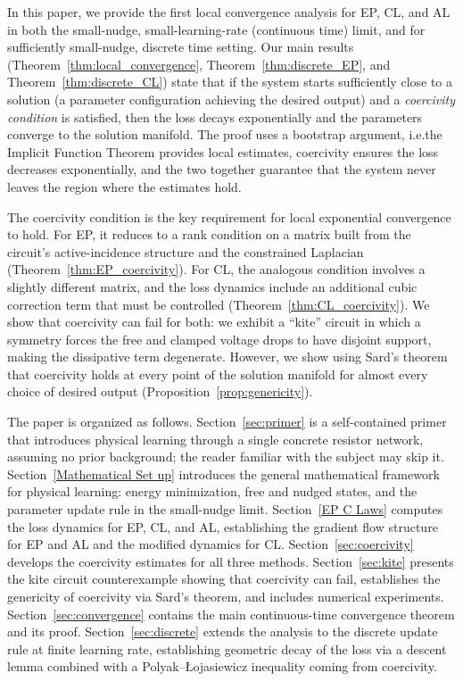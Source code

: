 \documentclass{siamart}
\begin{document}
In this paper, we provide the first local convergence analysis for EP, CL, and AL in both the small-nudge, small-learning-rate (continuous time) limit, and for sufficiently small-nudge, discrete time setting. Our main results (Theorem~\ref{thm:local_convergence}, Theorem~\ref{thm:discrete_EP}, and Theorem~\ref{thm:discrete_CL}) state that if the system starts sufficiently close to a solution (a parameter configuration achieving the desired output) and a \emph{coercivity condition} is satisfied, then the loss decays exponentially and the parameters converge to the solution manifold. The proof uses a bootstrap argument, i.e.\@ the Implicit Function Theorem provides local estimates, coercivity ensures the loss decreases exponentially, and the two together guarantee that the system never leaves the region where the estimates hold.

The coercivity condition is the key requirement for local exponential convergence to hold. For EP, it reduces to a rank condition on a matrix built from the circuit's active-incidence structure and the constrained Laplacian (Theorem~\ref{thm:EP_coercivity}). For CL, the analogous condition involves a slightly different matrix, and the loss dynamics include an additional cubic correction term that must be controlled (Theorem~\ref{thm:CL_coercivity}). We show that coercivity can fail for both: we exhibit a ``kite'' circuit in which a symmetry forces the free and clamped voltage drops to have disjoint support, making the dissipative term degenerate. However, we show using Sard's theorem that coercivity holds at every point of the solution manifold for almost every choice of desired output (Proposition~\ref{prop:genericity}).

The paper is organized as follows. Section~\ref{sec:primer} is a self-contained primer that introduces physical learning through a single concrete resistor network, assuming no prior background; the reader familiar with the subject may skip it. Section~\ref{Mathematical Set up} introduces the general mathematical framework for physical learning: energy minimization, free and nudged states, and the parameter update rule in the small-nudge limit. Section~\ref{EP C Laws} computes the loss dynamics for EP, CL, and AL, establishing the gradient flow structure for EP and AL and the modified dynamics for CL. Section~\ref{sec:coercivity} develops the coercivity estimates for all three methods. Section~\ref{sec:kite} presents the kite circuit counterexample showing that coercivity can fail, establishes the genericity of coercivity via Sard's theorem, and includes numerical experiments. Section~\ref{sec:convergence} contains the main continuous-time convergence theorem and its proof. Section~\ref{sec:discrete} extends the analysis to the discrete update rule at finite learning rate, establishing geometric decay of the loss via a descent lemma combined with a Polyak--\L{}ojasiewicz inequality coming from coercivity.
\end{document}
